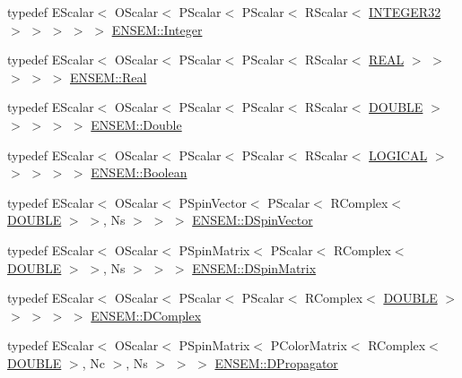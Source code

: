 \begin{DoxyCompactItemize}
\item 
typedef E\+Scalar$<$ O\+Scalar$<$ P\+Scalar$<$ P\+Scalar$<$ R\+Scalar$<$ \mbox{\hyperlink{adat-devel_2lib_2ensem_2ensem__precision_8h_af9ea51a62d33df371d837a018fe1a22e}{I\+N\+T\+E\+G\+E\+R32}} $>$ $>$ $>$ $>$ $>$ \mbox{\hyperlink{group__defs_gab13d060149cdd80ab40fd8d653f60117}{E\+N\+S\+E\+M\+::\+Integer}}
\item 
typedef E\+Scalar$<$ O\+Scalar$<$ P\+Scalar$<$ P\+Scalar$<$ R\+Scalar$<$ \mbox{\hyperlink{adat-devel_2lib_2ensem_2ensem__precision_8h_ad013361bb53824d5957cb0b391c72290}{R\+E\+AL}} $>$ $>$ $>$ $>$ $>$ \mbox{\hyperlink{group__defs_ga5483719647f0554b19174079436486fa}{E\+N\+S\+E\+M\+::\+Real}}
\item 
typedef E\+Scalar$<$ O\+Scalar$<$ P\+Scalar$<$ P\+Scalar$<$ R\+Scalar$<$ \mbox{\hyperlink{adat-devel_2lib_2ensem_2ensem__precision_8h_abcfc24a032c589afd6af1f9e4da2d5af}{D\+O\+U\+B\+LE}} $>$ $>$ $>$ $>$ $>$ \mbox{\hyperlink{group__defs_ga491906b5e5ffc41e1ec145d6ad29eb8b}{E\+N\+S\+E\+M\+::\+Double}}
\item 
typedef E\+Scalar$<$ O\+Scalar$<$ P\+Scalar$<$ P\+Scalar$<$ R\+Scalar$<$ \mbox{\hyperlink{adat-devel_2lib_2ensem_2ensem__precision_8h_aae96530932e7073fe821140b57d9faff}{L\+O\+G\+I\+C\+AL}} $>$ $>$ $>$ $>$ $>$ \mbox{\hyperlink{group__defs_ga38f0cd64d26e121e75367986f2d7cd6c}{E\+N\+S\+E\+M\+::\+Boolean}}
\item 
typedef E\+Scalar$<$ O\+Scalar$<$ P\+Spin\+Vector$<$ P\+Scalar$<$ R\+Complex$<$ \mbox{\hyperlink{adat-devel_2lib_2ensem_2ensem__precision_8h_abcfc24a032c589afd6af1f9e4da2d5af}{D\+O\+U\+B\+LE}} $>$ $>$, Ns $>$ $>$ $>$ \mbox{\hyperlink{group__defs_gab4f32134903c54aa9441e3bff44b44f5}{E\+N\+S\+E\+M\+::\+D\+Spin\+Vector}}
\item 
typedef E\+Scalar$<$ O\+Scalar$<$ P\+Spin\+Matrix$<$ P\+Scalar$<$ R\+Complex$<$ \mbox{\hyperlink{adat-devel_2lib_2ensem_2ensem__precision_8h_abcfc24a032c589afd6af1f9e4da2d5af}{D\+O\+U\+B\+LE}} $>$ $>$, Ns $>$ $>$ $>$ \mbox{\hyperlink{group__defs_ga3d56e7ee2403fec93fff9b7d4cd7d7cf}{E\+N\+S\+E\+M\+::\+D\+Spin\+Matrix}}
\item 
typedef E\+Scalar$<$ O\+Scalar$<$ P\+Scalar$<$ P\+Scalar$<$ R\+Complex$<$ \mbox{\hyperlink{adat-devel_2lib_2ensem_2ensem__precision_8h_abcfc24a032c589afd6af1f9e4da2d5af}{D\+O\+U\+B\+LE}} $>$ $>$ $>$ $>$ $>$ \mbox{\hyperlink{group__defs_ga06619af4c8e964a05d234fc7113321a6}{E\+N\+S\+E\+M\+::\+D\+Complex}}
\item 
typedef E\+Scalar$<$ O\+Scalar$<$ P\+Spin\+Matrix$<$ P\+Color\+Matrix$<$ R\+Complex$<$ \mbox{\hyperlink{adat-devel_2lib_2ensem_2ensem__precision_8h_abcfc24a032c589afd6af1f9e4da2d5af}{D\+O\+U\+B\+LE}} $>$, Nc $>$, Ns $>$ $>$ $>$ \mbox{\hyperlink{group__defs_ga4dacc58a6c2cf15e6072cd6fe4415a7c}{E\+N\+S\+E\+M\+::\+D\+Propagator}}

\end{DoxyCompactItemize}
